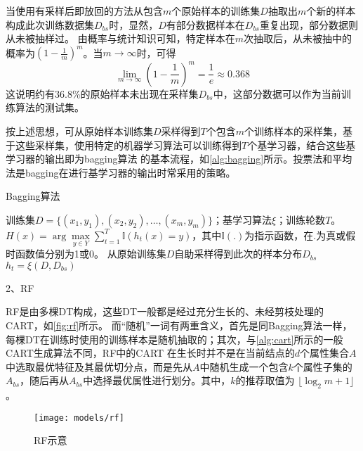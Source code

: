 当使用有采样后即放回的方法从包含$m$个原始样本的训练集$D$抽取出$m$个新的样本构成此次训练数据集$D_{bs}$时，显然，$D$有部分数据样本在$D_{bs}$重复出现，部分数据则从未被抽样过。
由概率与统计知识可知，特定样本在$m$次抽取后，从未被抽中的概率为$(1-\frac{1}{m})^m$。当$m \to \infty$时，可得
\begin{equation}
      \label{equ:me}
      \lim_{m \to \infty}{(1-\frac{1}{m})}^m = \frac{1}{e} \approx 0.368
\end{equation}
这说明约有36.8\%的原始样本未出现在采样集$D_{bs}$中，这部分数据可以作为当前训练算法的测试集。

按上述思想，可从原始样本训练集$D$采样得到$T$个包含$m$个训练样本的采样集，基于这些采样集，使用特定的机器学习算法可以训练得到$T$个基学习器，结合这些基学习器的输出即为bagging算法
的基本流程，如\autoref{alg:bagging}所示。投票法和平均法是bagging在进行基学习器的输出时常采用的策略。
\begin{breakablealgorithm}
      \caption[Bagging算法]{Bagging算法\cite{Zhou2016}}
      \label{alg:bagging}
      \begin{algorithmic}[1] %
            \Require 训练集$D=\{(x_1,y_1),(x_2,y_2),\dots,(x_m,y_m)\}$；基学习算法$\xi$；训练轮数$T$。
            \Ensure $H(x)=\arg \max \limits_{y \in Y} \sum_{t=1}^T \mathbb{I}(h_t(x)=y)$，其中$\mathbb{I}(.)$为指示函数，在$.$为真或假时函数值分别为1或0。
                  \State 从原始训练集$D$自助采样得到此次的样本分布$D_{bs}$
                  \State $h_t=\xi (D,D_{bs})$
            \EndFor
      \end{algorithmic}
\end{breakablealgorithm}

2、RF

RF是由多棵DT构成，这些DT一般都是经过充分生长的、未经剪枝处理的CART，如\autoref{fig:rf}所示。
而“随机”一词有两重含义，首先是同Bagging算法一样，每棵DT在训练时使用的训练样本是随机抽取的；其次，与\autoref{alg:cart}所示的一般CART生成算法不同，RF中的CART
在生长时并不是在当前结点的$d$个属性集合$A$中选取最优特征及其最优切分点，而是先从$A$中随机生成一个包含$k$个属性子集的$A_{bs}$，随后再从$A_{bs}$中选择最优属性进行划分\cite{Zhou2016,Liu2018,breiman2001}。其中，$k$的推荐取值为
$\lfloor \log_2m + 1 \rfloor$\cite{breiman2001}。

\begin{figure}[htbp]
      \centering
      \texttt{[image: models/rf]}
      \caption{\label{fig:rf}RF示意}
\end{figure}

